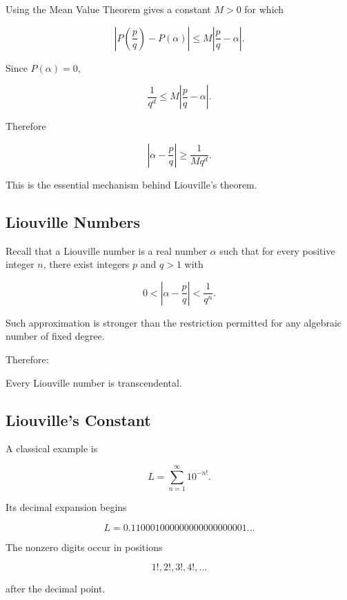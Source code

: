 Using the Mean Value Theorem gives a constant \(M>0\) for which

\[ \left|P\left(\frac pq\right)-P(\alpha)\right|\leq M\left|\frac pq-\alpha\right|. \]

Since \(P(\alpha)=0\),

\[ \frac1{q^d}\leq M\left|\frac pq-\alpha\right|. \]

Therefore

\[ \left|\alpha-\frac pq\right|\geq\frac1{Mq^d}. \]

This is the essential mechanism behind Liouville's theorem.

\subsection{Liouville Numbers}
\label{subsec:liouville-numbers-transcendence}

Recall that a Liouville number is a real number \(\alpha\) such that for
every positive integer \(n\), there exist integers \(p\) and \(q>1\) with

\[ 0<\left|\alpha-\frac pq\right|<\frac1{q^n}. \]

Such approximation is stronger than the restriction permitted for any
algebraic number of fixed degree.

Therefore:

\begin{theorem}
Every Liouville number is transcendental.
\end{theorem}

\subsection{Liouville's Constant}
\label{subsec:liouville-constant-transcendence}

A classical example is

\[ \boxed{L=\sum_{n=1}^{\infty}10^{-n!}.} \]

Its decimal expansion begins

\[ L=0.110001000000000000000001\ldots \]

The nonzero digits occur in positions

\[ 1!,2!,3!,4!,\ldots \]

after the decimal point.

